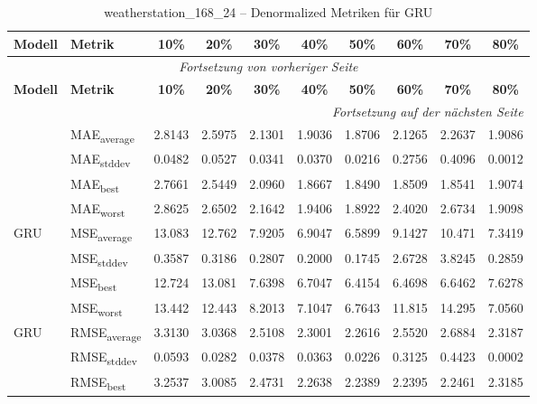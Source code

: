 {\small
\begin{longtable}{l l c c c c c c c c}
    \toprule
    \textbf{Modell} & \textbf{Metrik} & \textbf{10\%} & \textbf{20\%} & \textbf{30\%} & \textbf{40\%} & \textbf{50\%} & \textbf{60\%} & \textbf{70\%} & \textbf{80\%} \\
    \midrule
    \endfirsthead
    \multicolumn{10}{c}{\textit{Fortsetzung von vorheriger Seite}} \\
    \toprule
    \textbf{Modell} & \textbf{Metrik} & \textbf{10\%} & \textbf{20\%} & \textbf{30\%} & \textbf{40\%} & \textbf{50\%} & \textbf{60\%} & \textbf{70\%} & \textbf{80\%} \\
    \midrule
    \endhead
    \midrule
    \multicolumn{10}{r}{\textit{Fortsetzung auf der nächsten Seite}} \\
    \midrule
    \endfoot
    \bottomrule
    \caption{weatherstation_168_24 -- Denormalized Metriken für GRU}
    \label{tab:weatherstation_168_24_denormalized_gru}
    \endlastfoot
\multirow{4}{*}{GRU} & MAE\textsubscript{average} & 2.8143 & 2.5975 & 2.1301 & 1.9036 & 1.8706 & 2.1265 & 2.2637 & 1.9086 \\
 & MAE\textsubscript{stddev} & 0.0482 & 0.0527 & 0.0341 & 0.0370 & 0.0216 & 0.2756 & 0.4096 & 0.0012 \\
 & MAE\textsubscript{best} & 2.7661 & 2.5449 & 2.0960 & 1.8667 & 1.8490 & 1.8509 & 1.8541 & 1.9074 \\
 & MAE\textsubscript{worst} & 2.8625 & 2.6502 & 2.1642 & 1.9406 & 1.8922 & 2.4020 & 2.6734 & 1.9098 \\
\cmidrule(lr){2-10}
\multirow{4}{*}{GRU} & MSE\textsubscript{average} & 13.083 & 12.762 & 7.9205 & 6.9047 & 6.5899 & 9.1427 & 10.471 & 7.3419 \\
 & MSE\textsubscript{stddev} & 0.3587 & 0.3186 & 0.2807 & 0.2000 & 0.1745 & 2.6728 & 3.8245 & 0.2859 \\
 & MSE\textsubscript{best} & 12.724 & 13.081 & 7.6398 & 6.7047 & 6.4154 & 6.4698 & 6.6462 & 7.6278 \\
 & MSE\textsubscript{worst} & 13.442 & 12.443 & 8.2013 & 7.1047 & 6.7643 & 11.815 & 14.295 & 7.0560 \\
\cmidrule(lr){2-10}
\multirow{4}{*}{GRU} & RMSE\textsubscript{average} & 3.3130 & 3.0368 & 2.5108 & 2.3001 & 2.2616 & 2.5520 & 2.6884 & 2.3187 \\
 & RMSE\textsubscript{stddev} & 0.0593 & 0.0282 & 0.0378 & 0.0363 & 0.0226 & 0.3125 & 0.4423 & 0.0002 \\
 & RMSE\textsubscript{best} & 3.2537 & 3.0085 & 2.4731 & 2.2638 & 2.2389 & 2.2395 & 2.2461 & 2.3185 \\

\end{longtable}}
